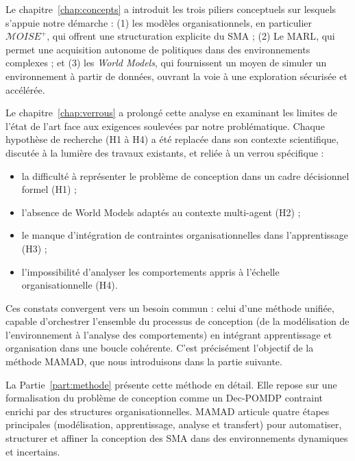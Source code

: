 \medskip

\noindent
Le chapitre~\autoref{chap:concepts} a introduit les trois piliers conceptuels sur lesquels s'appuie notre démarche : (1) les modèles organisationnels, en particulier \textit{$\mathcal{M}OISE^+$}, qui offrent une structuration explicite du \ac{SMA} ; (2) Le \ac{MARL}, qui permet une acquisition autonome de politiques dans des environnements complexes ; et (3) les \textit{World Models}, qui fournissent un moyen de simuler un environnement à partir de données, ouvrant la voie à une exploration sécurisée et accélérée.

\noindent
Le chapitre~\autoref{chap:verrous} a prolongé cette analyse en examinant les limites de l'état de l'art face aux exigences soulevées par notre problématique. Chaque hypothèse de recherche (H1 à H4) a été replacée dans son contexte scientifique, discutée à la lumière des travaux existants, et reliée à un verrou spécifique :
\begin{itemize}
    \item la difficulté à représenter le problème de conception dans un cadre décisionnel formel (H1) ;
    \item l'absence de World Models adaptés au contexte multi-agent (H2) ;
    \item le manque d'intégration de contraintes organisationnelles dans l'apprentissage (H3) ;
    \item l'impossibilité d'analyser les comportements appris à l'échelle organisationnelle (H4).
\end{itemize}

\medskip

\noindent
Ces constats convergent vers un besoin commun : celui d'une méthode unifiée, capable d'orchestrer l'ensemble du processus de conception (de la modélisation de l'environnement à l'analyse des comportements) en intégrant apprentissage et organisation dans une boucle cohérente. C'est précisément l'objectif de la méthode \ac{MAMAD}, que nous introduisons dans la partie suivante.

\noindent
La Partie~\autoref{part:methode} présente cette méthode en détail. Elle repose sur une formalisation du problème de conception comme un \ac{Dec-POMDP} contraint enrichi par des structures organisationnelles. \ac{MAMAD} articule quatre étapes principales (modélisation, apprentissage, analyse et transfert) pour automatiser, structurer et affiner la conception des \ac{SMA} dans des environnements dynamiques et incertains.
